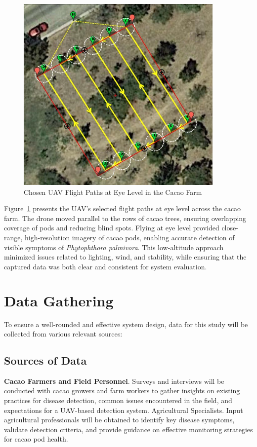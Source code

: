 \begin{figure}[H]
	\centering
	\caption{Chosen UAV Flight Paths at Eye Level in the Cacao Farm}
	\label{fig:uav_flight_paths}
	\includegraphics[width=0.9\textwidth]{figures/Uav_Flight_Paths.png}
\end{figure}


Figure~\ref{fig:uav_flight_paths} presents the UAV’s selected flight paths at eye level across the cacao farm.
The drone moved parallel to the rows of cacao trees, ensuring overlapping coverage of pods and reducing blind spots.
Flying at eye level provided close-range, high-resolution imagery of cacao pods, enabling accurate detection of visible symptoms of \textit{Phytophthora palmivora}.
This low-altitude approach minimized issues related to lighting, wind, and stability, while ensuring that the captured data was both clear and consistent for system evaluation.

\section{Data Gathering}
To ensure a well-rounded and effective system design, data for this study will be collected from various relevant sources:
\subsection{Sources of Data}
\textbf{Cacao Farmers and Field Personnel}. Surveys and interviews will be conducted with cacao growers and farm workers to gather insights on existing practices for disease detection, common issues encountered in the field, and expectations for a UAV-based detection system. Agricultural Specialists. Input agricultural professionals will be obtained to identify key disease symptoms, validate detection criteria, and provide guidance on effective monitoring strategies for cacao pod health.

